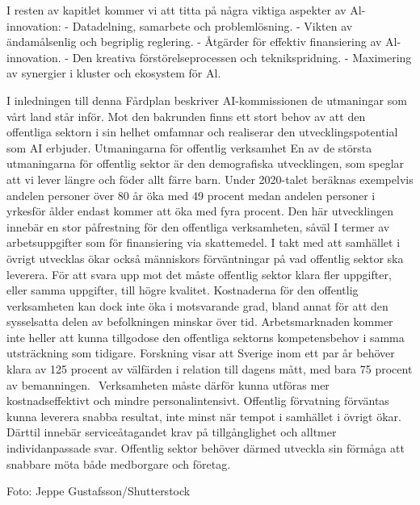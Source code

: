 {{{{{{{{{{{{{{{{{{I resten av kapitlet kommer vi att titta på några viktiga aspekter av Al-innovation:
- Datadelning, samarbete och problemlösning.
- Vikten av ändamålsenlig och begriplig reglering.
- Åtgärder för effektiv finansiering av Al-innovation.
- Den kreativa förstörelseprocessen och teknikspridning.
- Maximering av synergier i kluster och ekosystem för Al.

I inledningen till denna Fårdplan beskriver AI-kommissionen de utmaningar som vårt land står inför. Mot den bakrunden finns ett stort behov av att den offentliga sektorn i sin helhet omfamnar och realiserar den utvecklingspotential som AI erbjuder.
Utmaningarna för offentlig verksamhet En av de största utmaningarna för offentlig sektor är den demografiska utvecklingen, som speglar att vi lever längre och föder allt färre barn. Under 2020-talet beräknas exempelvis andelen personer över 80 år öka med 49 procent medan andelen personer i yrkesför ålder endast kommer att öka med fyra procent. Den här utvecklingen innebär en stor påfrestning för den offentliga verksamheten, såväl I termer av arbetsuppgifter som för finansiering via skattemedel. I takt med att samhället i övrigt utvecklas ökar också människors förväntningar på vad offentlig sektor ska leverera. För att svara upp mot det måste offentlig sektor klara fler uppgifter, eller samma uppgifter, till högre kvalitet.
Kostnaderna för den offentlig verksamheten kan dock inte öka i motsvarande grad, bland annat för att den sysselsatta delen av befolkningen minskar över tid. Arbetsmarknaden kommer inte heller att kunna tillgodose den offentliga sektorns kompetensbehov i samma utsträckning som tidigare. Forskning visar att Sverige inom ett par år behöver klara av 125 procent av välfärden i relation till dagens mått, med bara 75 procent av bemanningen. \({ }^{}\) Verksamheten måste därför kunna utföras mer kostnadseffektivt och mindre personalintensivt.
Offentlig förvatning förväntas kunna leverera snabba resultat, inte minst när tempot i samhället i övrigt ökar. Därttil innebär serviceåtagandet krav på tillgånglighet och alltmer individanpassade svar. Offentlig sektor behöver därmed utveckla sin förmåga att snabbare möta både medborgare och företag.

Foto: Jeppe Gustafsson/Shutterstock
}}}}}}}}}}}}}}}}}}
